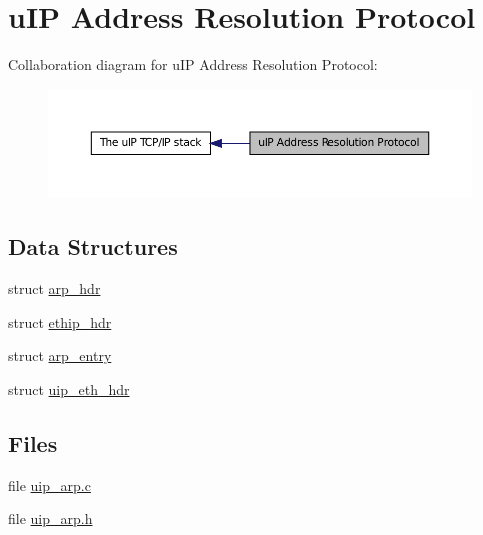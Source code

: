 \hypertarget{group__uiparp}{
\section{uIP Address Resolution Protocol}
\label{group__uiparp}
}


Collaboration diagram for uIP Address Resolution Protocol:
\nopagebreak
\begin{figure}[H]
\begin{center}
\leavevmode
\includegraphics[width=396pt]{group__uiparp}
\end{center}
\end{figure}


\subsection*{Data Structures}
\begin{DoxyCompactItemize}
\item 
struct \hyperlink{structarp__hdr}{arp\_\-hdr}
\item 
struct \hyperlink{structethip__hdr}{ethip\_\-hdr}
\item 
struct \hyperlink{structarp__entry}{arp\_\-entry}
\item 
struct \hyperlink{structuip__eth__hdr}{uip\_\-eth\_\-hdr}
\end{DoxyCompactItemize}
\subsection*{Files}
\begin{DoxyCompactItemize}
\item 
file \hyperlink{uip__arp_8c}{uip\_\-arp.c}
\item 
file \hyperlink{uip__arp_8h}{uip\_\-arp.h}
\end{DoxyCompactItemize}
